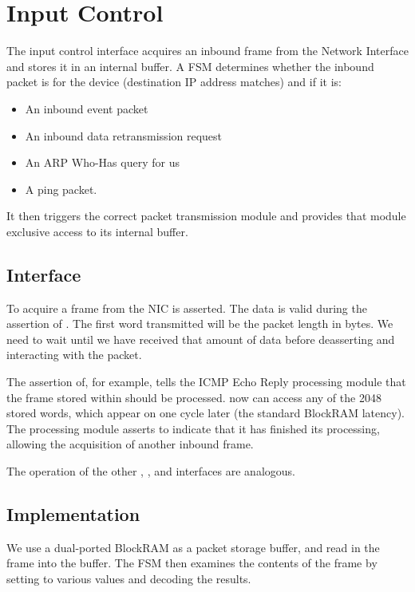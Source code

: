 \section{Input Control}

The input control interface acquires an inbound frame from the Network
Interface and stores it in an internal buffer. A FSM determines
whether the inbound packet is for the device (destination IP address
matches) and if it is: 

\begin{itemize}
\item An inbound event packet
\item An inbound data retransmission request
\item An ARP Who-Has query for us
\item A ping packet. 
\end{itemize}

It then triggers the correct packet transmission module and provides
that module exclusive access to its internal buffer.


\subsection{Interface}
To acquire a frame from the NIC  is asserted.  The
data is valid during the assertion of . The first word
transmitted will be the packet length in bytes. We need to wait until
we have received that amount of data before deasserting
 and interacting with the packet.

The assertion of, for example,  tells the ICMP Echo
Reply processing module that the frame stored within should be
processed.  now can access any of the 2048
stored words, which appear on  one cycle later
(the standard BlockRAM latency). The processing module asserts
 to indicate that it has finished its processing,
allowing the acquisition of another inbound frame.

The operation of the other , , and
 interfaces are analogous.

\subsection{Implementation} 

We use a dual-ported BlockRAM as a packet storage buffer, and read in
the frame into the buffer. The FSM then examines the contents of the
frame by setting  to various values and decoding the
results.

